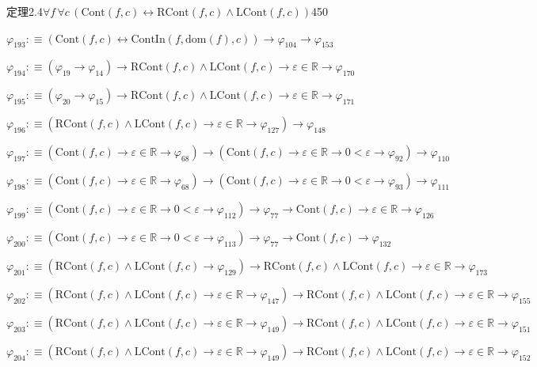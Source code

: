 \begin{fullproof}{定理2.4}{$\forall f\,\forall c\,(\mathrm{Cont}(f,c) \leftrightarrow \mathrm{RCont}(f,c) \land \mathrm{LCont}(f,c))$}{450}
\begin{abbrevlist}
\item $\varphi_{193} :\equiv (\mathrm{Cont}(f,c) \leftrightarrow \mathrm{ContIn}(f,\mathrm{dom}(f),c)) \to \varphi_{104} \to \varphi_{153}$
\item $\varphi_{194} :\equiv (\varphi_{19} \to \varphi_{14}) \to \mathrm{RCont}(f,c) \land \mathrm{LCont}(f,c) \to \varepsilon \in \mathbb{R} \to \varphi_{170}$
\item $\varphi_{195} :\equiv (\varphi_{20} \to \varphi_{15}) \to \mathrm{RCont}(f,c) \land \mathrm{LCont}(f,c) \to \varepsilon \in \mathbb{R} \to \varphi_{171}$
\item $\varphi_{196} :\equiv (\mathrm{RCont}(f,c) \land \mathrm{LCont}(f,c) \to \varepsilon \in \mathbb{R} \to \varphi_{127}) \to \varphi_{148}$
\item $\varphi_{197} :\equiv (\mathrm{Cont}(f,c) \to \varepsilon \in \mathbb{R} \to \varphi_{68}) \to (\mathrm{Cont}(f,c) \to \varepsilon \in \mathbb{R} \to 0 < \varepsilon \to \varphi_{92}) \to \varphi_{110}$
\item $\varphi_{198} :\equiv (\mathrm{Cont}(f,c) \to \varepsilon \in \mathbb{R} \to \varphi_{68}) \to (\mathrm{Cont}(f,c) \to \varepsilon \in \mathbb{R} \to 0 < \varepsilon \to \varphi_{93}) \to \varphi_{111}$
\item $\varphi_{199} :\equiv (\mathrm{Cont}(f,c) \to \varepsilon \in \mathbb{R} \to 0 < \varepsilon \to \varphi_{112}) \to \varphi_{77} \to \mathrm{Cont}(f,c) \to \varepsilon \in \mathbb{R} \to \varphi_{126}$
\item $\varphi_{200} :\equiv (\mathrm{Cont}(f,c) \to \varepsilon \in \mathbb{R} \to 0 < \varepsilon \to \varphi_{113}) \to \varphi_{77} \to \mathrm{Cont}(f,c) \to \varphi_{132}$
\item $\varphi_{201} :\equiv (\mathrm{RCont}(f,c) \land \mathrm{LCont}(f,c) \to \varphi_{129}) \to \mathrm{RCont}(f,c) \land \mathrm{LCont}(f,c) \to \varepsilon \in \mathbb{R} \to \varphi_{173}$
\item $\varphi_{202} :\equiv (\mathrm{RCont}(f,c) \land \mathrm{LCont}(f,c) \to \varepsilon \in \mathbb{R} \to \varphi_{147}) \to \mathrm{RCont}(f,c) \land \mathrm{LCont}(f,c) \to \varepsilon \in \mathbb{R} \to \varphi_{155}$
\item $\varphi_{203} :\equiv (\mathrm{RCont}(f,c) \land \mathrm{LCont}(f,c) \to \varepsilon \in \mathbb{R} \to \varphi_{149}) \to \mathrm{RCont}(f,c) \land \mathrm{LCont}(f,c) \to \varepsilon \in \mathbb{R} \to \varphi_{151}$
\item $\varphi_{204} :\equiv (\mathrm{RCont}(f,c) \land \mathrm{LCont}(f,c) \to \varepsilon \in \mathbb{R} \to \varphi_{149}) \to \mathrm{RCont}(f,c) \land \mathrm{LCont}(f,c) \to \varepsilon \in \mathbb{R} \to \varphi_{152}$

\end{abbrevlist}
\end{fullproof}

